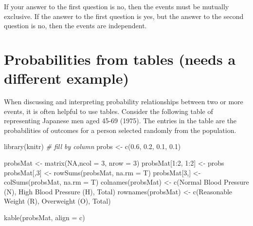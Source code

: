 \documentclass[
]{book}
\newenvironment{Shaded}{\begin{snugshade}}{\end{snugshade}}
\newcommand{\AttributeTok}[1]{\textcolor[rgb]{0.77,0.63,0.00}{#1}}
\newcommand{\CommentTok}[1]{\textcolor[rgb]{0.56,0.35,0.01}{\textit{#1}}}
\newcommand{\ConstantTok}[1]{\textcolor[rgb]{0.00,0.00,0.00}{#1}}
\newcommand{\DecValTok}[1]{\textcolor[rgb]{0.00,0.00,0.81}{#1}}
\newcommand{\FloatTok}[1]{\textcolor[rgb]{0.00,0.00,0.81}{#1}}
\newcommand{\FunctionTok}[1]{\textcolor[rgb]{0.00,0.00,0.00}{#1}}
\newcommand{\NormalTok}[1]{#1}
\newcommand{\OtherTok}[1]{\textcolor[rgb]{0.56,0.35,0.01}{#1}}
\newcommand{\SpecialCharTok}[1]{\textcolor[rgb]{0.00,0.00,0.00}{#1}}
\newcommand{\StringTok}[1]{\textcolor[rgb]{0.31,0.60,0.02}{#1}}
\theoremstyle{definition}
\theoremstyle{definition}
\theoremstyle{definition}
\theoremstyle{remark}
\begin{document}
If your answer to the first question is no, then the events must be mutually exclusive. If the answer to the first question is yes, but the answer to the second question is no, then the events are independent.

\hypertarget{ch4_s4}{%
\section{Probabilities from tables (needs a different example)}\label{ch4_s4}}

When discussing and interpreting probability relationships between two or more events, it is often helpful to use tables. Consider the following table of representing Japanese men aged 45-69 (1975). The entries in the table are the probabilities of outcomes for a person selected randomly from the population.

\begin{Shaded}
\begin{Highlighting}[]
\FunctionTok{library}\NormalTok{(knitr)}
\CommentTok{\# fill by column}
\NormalTok{probs }\OtherTok{\textless{}{-}} \FunctionTok{c}\NormalTok{(}\FloatTok{0.6}\NormalTok{, }\FloatTok{0.2}\NormalTok{, }\FloatTok{0.1}\NormalTok{, }\FloatTok{0.1}\NormalTok{)}

\NormalTok{probsMat }\OtherTok{\textless{}{-}} \FunctionTok{matrix}\NormalTok{(}\ConstantTok{NA}\NormalTok{,}\AttributeTok{ncol =} \DecValTok{3}\NormalTok{, }\AttributeTok{nrow =} \DecValTok{3}\NormalTok{)}
\NormalTok{probsMat[}\DecValTok{1}\SpecialCharTok{:}\DecValTok{2}\NormalTok{, }\DecValTok{1}\SpecialCharTok{:}\DecValTok{2}\NormalTok{] }\OtherTok{\textless{}{-}}\NormalTok{ probs}
\NormalTok{probsMat[,}\DecValTok{3}\NormalTok{] }\OtherTok{\textless{}{-}} \FunctionTok{rowSums}\NormalTok{(probsMat, }\AttributeTok{na.rm =}\NormalTok{ T)}
\NormalTok{probsMat[}\DecValTok{3}\NormalTok{,] }\OtherTok{\textless{}{-}} \FunctionTok{colSums}\NormalTok{(probsMat, }\AttributeTok{na.rm =}\NormalTok{ T)}
\FunctionTok{colnames}\NormalTok{(probsMat) }\OtherTok{\textless{}{-}} \FunctionTok{c}\NormalTok{(}\StringTok{\textquotesingle{}Normal Blood Pressure (N)\textquotesingle{}}\NormalTok{, }\StringTok{\textquotesingle{}High Blood Pressure (H)\textquotesingle{}}\NormalTok{, }\StringTok{\textquotesingle{}Total\textquotesingle{}}\NormalTok{)}
\FunctionTok{rownames}\NormalTok{(probsMat) }\OtherTok{\textless{}{-}} \FunctionTok{c}\NormalTok{(}\StringTok{\textquotesingle{}Reasonable Weight (R)\textquotesingle{}}\NormalTok{, }\StringTok{\textquotesingle{}Overweight (O)\textquotesingle{}}\NormalTok{, }\StringTok{\textquotesingle{}Total\textquotesingle{}}\NormalTok{)}

\FunctionTok{kable}\NormalTok{(probsMat, }\AttributeTok{align =} \StringTok{\textquotesingle{}c\textquotesingle{}}\NormalTok{)}
\end{Highlighting}
\end{Shaded}
\end{document}
